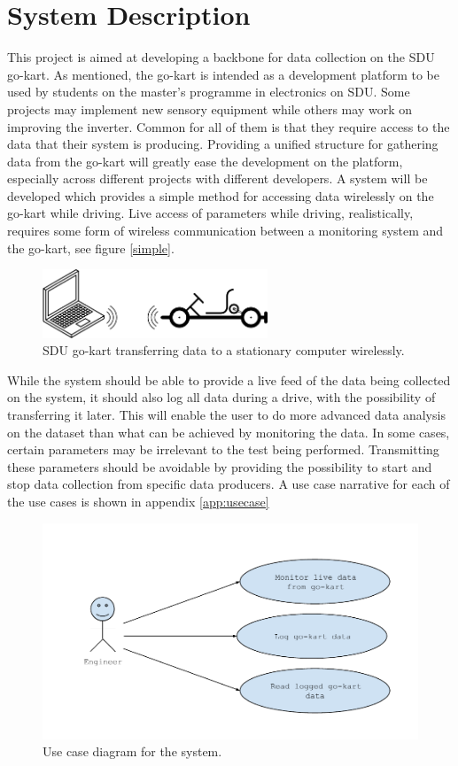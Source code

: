 \section{System Description}
\label{sec:system_description}
This project is aimed at developing a backbone for data collection on the SDU go-kart.
As mentioned, the go-kart is intended as a development platform to be used by students on the master's programme in electronics on SDU.
Some projects may implement new sensory equipment while others may work on improving the inverter.
Common for all of them is that they require access to the data that their system is producing.
Providing a unified structure for gathering data from the go-kart will greatly ease the development on the platform, especially across different projects with different developers.
A system will be developed which provides a simple method for accessing data wirelessly on the go-kart while driving.
Live access of parameters while driving, realistically, requires some form of wireless communication between a monitoring system and the go-kart, see figure \ref{simple}.

\begin{figure}[h]
 	\centering
    \includegraphics[width=0.6\textwidth]{graphics/go_kart_network_simple}
    \caption{SDU go-kart transferring data to a stationary computer wirelessly.}
    \label{fig:simple}
\end{figure}

While the system should be able to provide a live feed of the data being collected on the system, it should also log all data during a drive, with the possibility of transferring it later.
This will enable the user to do more advanced data analysis on the dataset than what can be achieved by monitoring the data.
In some cases, certain parameters may be irrelevant to the test being performed.
Transmitting these parameters should be avoidable by providing the possibility to start and stop data collection from specific data producers.
A use case narrative for each of the use cases is shown in appendix \ref{app:usecase}

\begin{figure}[h]
 	\centering
    \includegraphics[width=1\textwidth]{graphics/use_cases}
    \caption{Use case diagram for the system.}
    \label{fig:usecases}
\end{figure}